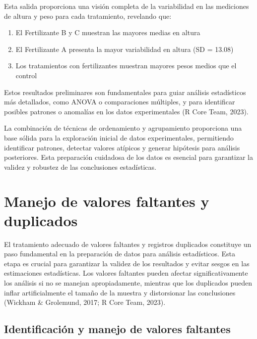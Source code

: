 \documentclass[
  spanish,
  a4paper,
  DIV=11,
  numbers=noendperiod,
  onepage,
  openany]{scrreprt}
\begin{document}
Esta salida proporciona una visión completa de la variabilidad en las
mediciones de altura y peso para cada tratamiento, revelando que:

\begin{enumerate}
\def\labelenumi{\arabic{enumi}.}
\item
  El Fertilizante B y C muestran las mayores medias en altura
\item
  El Fertilizante A presenta la mayor variabilidad en altura (SD =
  13.08)
\item
  Los tratamientos con fertilizantes muestran mayores pesos medios que
  el control
\end{enumerate}

Estos resultados preliminares son fundamentales para guiar análisis
estadísticos más detallados, como ANOVA o comparaciones múltiples, y
para identificar posibles patrones o anomalías en los datos
experimentales (R Core Team, 2023).

La combinación de técnicas de ordenamiento y agrupamiento proporciona
una base sólida para la exploración inicial de datos experimentales,
permitiendo identificar patrones, detectar valores atípicos y generar
hipótesis para análisis posteriores. Esta preparación cuidadosa de los
datos es esencial para garantizar la validez y robustez de las
conclusiones estadísticas.

\section{Manejo de valores faltantes y
duplicados}\label{manejo-de-valores-faltantes-y-duplicados}

El tratamiento adecuado de valores faltantes y registros duplicados
constituye un paso fundamental en la preparación de datos para análisis
estadísticos. Esta etapa es crucial para garantizar la validez de los
resultados y evitar sesgos en las estimaciones estadísticas. Los valores
faltantes pueden afectar significativamente los análisis si no se
manejan apropiadamente, mientras que los duplicados pueden inflar
artificialmente el tamaño de la muestra y distorsionar las conclusiones
(Wickham \& Grolemund, 2017; R Core Team, 2023).

\subsection{Identificación y manejo de valores
faltantes}\label{identificaciuxf3n-y-manejo-de-valores-faltantes}
\end{document}
